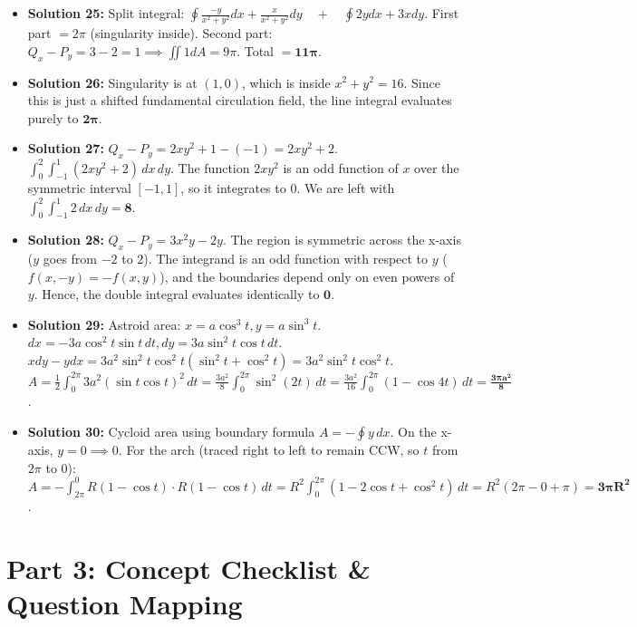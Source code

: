 \documentclass[11pt]{article}
\begin{document}
\begin{itemize}[leftmargin=*]
    \item \textbf{Solution 25:} Split integral: $\oint \frac{-y}{x^2+y^2}dx + \frac{x}{x^2+y^2}dy \quad + \quad \oint 2ydx + 3xdy$.
    First part $= 2\pi$ (singularity inside). Second part: $Q_x - P_y = 3 - 2 = 1 \implies \iint 1 dA = 9\pi$. Total $= \mathbf{11\pi}$.

    \item \textbf{Solution 26:} Singularity is at $(1,0)$, which is inside $x^2+y^2=16$.
    Since this is just a shifted fundamental circulation field, the line integral evaluates purely to $\mathbf{2\pi}$.

    \item \textbf{Solution 27:} $Q_x - P_y = 2xy^2 + 1 - (-1) = 2xy^2 + 2$.
    $\int_0^2 \int_{-1}^1 (2xy^2 + 2) \,dx \,dy$. The function $2xy^2$ is an odd function of $x$ over the symmetric interval $[-1,1]$, so it integrates to $0$. We are left with $\int_0^2 \int_{-1}^1 2 \,dx \,dy = \mathbf{8}$.

    \item \textbf{Solution 28:} $Q_x - P_y = 3x^2y - 2y$. 
    The region is symmetric across the x-axis ($y$ goes from $-2$ to $2$). The integrand is an odd function with respect to $y$ ($f(x,-y) = -f(x,y)$), and the boundaries depend only on even powers of $y$. Hence, the double integral evaluates identically to $\mathbf{0}$.

    \item \textbf{Solution 29:} Astroid area: $x = a \cos^3 t, y = a \sin^3 t$.
    $dx = -3a \cos^2 t \sin t \,dt, dy = 3a \sin^2 t \cos t \,dt$.
    $x dy - y dx = 3a^2 \sin^2 t \cos^2 t (\sin^2 t + \cos^2 t) = 3a^2 \sin^2 t \cos^2 t$.
    $A = \frac{1}{2} \int_0^{2\pi} 3a^2 (\sin t \cos t)^2 \,dt = \frac{3a^2}{8} \int_0^{2\pi} \sin^2(2t) \,dt = \frac{3a^2}{16} \int_0^{2\pi} (1 - \cos 4t) \,dt = \mathbf{\frac{3\pi a^2}{8}}$.

    \item \textbf{Solution 30:} Cycloid area using boundary formula $A = - \oint y \,dx$. 
    On the x-axis, $y=0 \implies 0$. For the arch (traced right to left to remain CCW, so $t$ from $2\pi$ to $0$):
    $A = - \int_{2\pi}^0 R(1-\cos t) \cdot R(1-\cos t) \,dt = R^2 \int_0^{2\pi} (1 - 2\cos t + \cos^2 t) \,dt = R^2(2\pi - 0 + \pi) = \mathbf{3\pi R^2}$.
\end{itemize}

\newpage
\section{Part 3: Concept Checklist \& Question Mapping}
\end{document}

